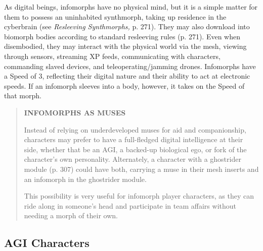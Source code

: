As digital beings, infomorphs have no physical mind, but it is a simple matter for them to possess an uninhabited synthmorph, taking up residence in the cyberbrain (see \textit{Resleeving Synthmorphs,} p. 271). They may also download into biomorph bodies according to standard resleeving rules (p. 271). Even when disembodied, they may interact with the physical world via the mesh, viewing through sensors, streaming XP feeds, communicating with characters, commanding slaved devices, and teleoperating/jamming drones. Infomorphs have a Speed of 3, reflecting their digital nature and their ability to act at electronic speeds. If an infomorph sleeves into a body, however, it takes on the Speed of that morph. 



\begin{quotation} \textbf{INFOMORPHS AS MUSES} 

Instead of relying on underdeveloped muses for aid and companionship, characters may prefer to have a full-fledged digital intelligence at their side, whether that be an AGI, a backed-up biological ego, or fork of the character’s own personality. Alternately, a character with a ghostrider module (p. 307) could have both, carrying a muse in their mesh inserts and an infomorph in the ghostrider module. 

This possibility is very useful for infomorph player characters, as they can ride along in someone’s head and participate in team affairs without needing a morph of their own. \end{quotation} 

\subsection{AGI Characters} 

